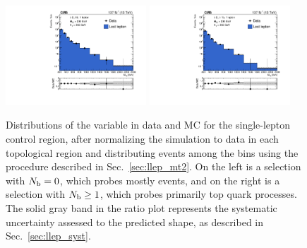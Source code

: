 \begin{figure}[t]
  \begin{center}
    \includegraphics[width=0.47\textwidth]{figs/llep/lostlepHybrid_0b_mt2bins.pdf}
    \includegraphics[width=0.47\textwidth]{figs/llep/lostlepHybrid_ge1b_mt2bins.pdf}
    \caption{Distributions of the \mttwo variable in data and MC for the single-lepton control region,
      after normalizing the simulation to data in each topological region and distributing events
      among the \mttwo bins using the procedure described in Sec.~\ref{sec:llep_mt2}. On the left is a selection
      with $N_{\mathrm{b}}=0$, which probes mostly \wjets events, and on the right is a selection with $N_{\mathrm{b}}\geq1$, which
      probes primarily top quark processes. The solid gray band  in the ratio plot represents the
      systematic uncertainty assessed to the predicted \mttwo shape, as described in Sec.~\ref{sec:llep_syst}.
            }
    \label{fig:llep_mt2dist}
  \end{center}
\end{figure}

